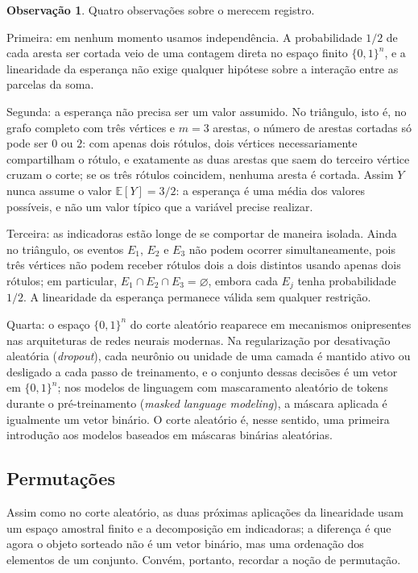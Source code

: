 \documentclass[12pt,portuguese]{article}
\theoremstyle{definition}
\newtheorem{remark}[remark]{Observação}
\begin{document}
\begin{remark}\label{rem:corte-linearidade}
Quatro observações sobre o  merecem registro.

Primeira: em nenhum momento usamos independência. A probabilidade $1/2$ de
cada aresta ser cortada veio de uma contagem direta no espaço finito
$\{0,1\}^n$, e a linearidade da esperança não exige qualquer hipótese sobre a
interação entre as parcelas da soma.

Segunda: a esperança não precisa ser um valor assumido. No triângulo, isto é,
no grafo completo com três vértices e $m=3$ arestas, o número de arestas
cortadas só pode ser $0$ ou $2$: com apenas dois rótulos, dois vértices
necessariamente compartilham o rótulo, e exatamente as duas arestas que saem
do terceiro vértice cruzam o corte; se os três rótulos coincidem, nenhuma
aresta é cortada. Assim $Y$ nunca assume o valor $\mathbb{E}[Y]=3/2$: a
esperança é uma média dos valores possíveis, e não um valor típico que a
variável precise realizar.

Terceira: as indicadoras estão longe de se comportar de maneira isolada.
Ainda no triângulo, os eventos $E_1$, $E_2$ e $E_3$ não podem ocorrer
simultaneamente, pois três vértices não podem receber rótulos dois a dois
distintos usando apenas dois rótulos; em particular,
$E_1\cap E_2\cap E_3=\varnothing$, embora cada $E_j$ tenha probabilidade
$1/2$. A linearidade da esperança permanece válida sem qualquer restrição.

Quarta: o espaço $\{0,1\}^n$ do corte aleatório reaparece em mecanismos
onipresentes nas arquiteturas de redes neurais modernas. Na regularização por
desativação aleatória (\emph{dropout}), cada neurônio ou unidade de uma camada
é mantido ativo ou desligado a cada passo de treinamento, e o conjunto dessas
decisões é um vetor em $\{0,1\}^n$; nos modelos de linguagem com mascaramento
aleatório de tokens durante o pré-treinamento (\emph{masked language
modeling}), a máscara aplicada é igualmente um vetor binário. O corte aleatório
é, nesse sentido, uma primeira introdução aos modelos baseados em máscaras
binárias aleatórias.
\end{remark}

\subsection{Permutações}\label{subsec:permutacoes}

Assim como no corte aleatório, as duas próximas aplicações da linearidade
usam um espaço amostral finito e a decomposição em indicadoras; a diferença é
que agora o objeto sorteado não é um vetor binário, mas uma ordenação dos
elementos de um conjunto. Convém, portanto, recordar a noção de permutação.
\end{document}
